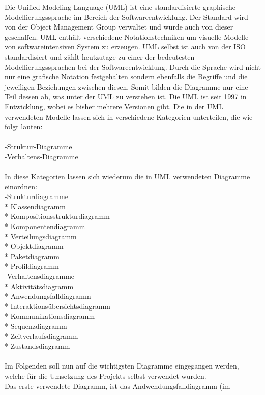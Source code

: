Die Unified Modeling Language (UML) ist eine standardisierte graphische Modellierungssprache im Bereich der Softwareentwicklung. Der Standard wird von der Object Management Group verwaltet und wurde auch von dieser geschaffen. UML enthält verschiedene Notationstechniken um visuelle Modelle von softwareintensiven System zu erzeugen. UML selbst ist auch von der ISO standardisiert und zählt heutzutage zu einer der bedeutesten Modellierungssprachen bei der Softwareentwicklung. Durch die Sprache wird nicht nur eine grafische Notation festgehalten sondern ebenfalls die Begriffe und die jeweiligen Beziehungen zwischen diesen. Somit bilden die Diagramme nur eine Teil dessen ab, was unter der UML zu verstehen ist.
Die UML ist seit 1997 in Entwicklung, wobei es bisher mehrere Versionen gibt.
Die in der UML verwendeten Modelle lassen sich in verschiedene Kategorien unterteilen, die wie folgt lauten:\\
\\
-Struktur-Diagramme\\
-Verhaltens-Diagramme\\
\\
In diese Kategorien lassen sich wiederum die in UML verwendeten Diagramme einordnen:\\
-Strukturdiagramme\\
    * Klassendiagramm\\
    * Kompositionsstrukturdiagramm\\
    * Komponentendiagramm\\
    * Verteilungsdiagramm\\
    * Objektdiagramm\\
    * Paketdiagramm\\
    * Profildiagramm\\
-Verhaltensdiagramme\\
    * Aktivitätsdiagramm\\
    * Anwendungsfalldiagramm\\
    * Interaktionsübersichtsdiagramm\\
    * Kommunikationsdiagramm\\
    * Sequenzdiagramm\\
    * Zeitverlaufsdiagramm\\
    * Zustandsdiagramm\\
\\
Im Folgenden soll nun auf die wichtigsten Diagramme eingegangen werden, welche für die Umsetzung des Projekts selbst verwendet wurden.\\
Das erste verwendete Diagramm, ist das Andwendungsfalldiagramm (im
